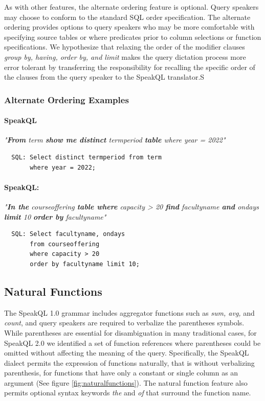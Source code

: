 As with other features, the alternate ordering feature is optional. Query speakers may choose to conform to the standard SQL order specification. The alternate ordering provides options to query speakers who may be more comfortable with specifying source tables or where predicates prior to column selections or function specifications. We hypothesize that relaxing the order of the modifier clauses \emph{group by, having, order by, and limit} makes the query dictation process more error tolerant by transferring the responsibility for recalling the specific order of the clauses from the query speaker to the SpeakQL translator.S

\subsubsection{Alternate Ordering Examples}

\paragraph{SpeakQL} \emph{"\textbf{From} term \textbf{show me distinct} termperiod  \textbf{table} where year = 2022"}
\begin{verbatim}
  SQL: Select distinct termperiod from term 
       where year = 2022;
\end{verbatim}

\paragraph{SpeakQL:} \emph{"\textbf{In the} courseoffering \textbf{table where} capacity > 20 \textbf{find} facultyname \textbf{and} ondays \textbf{limit} 10 \textbf{order by} facultyname"}
\begin{verbatim}
  SQL: Select facultyname, ondays 
       from courseoffering 
       where capacity > 20 
       order by facultyname limit 10;
\end{verbatim}


\subsection{Natural Functions}

The SpeakQL 1.0 grammar includes aggregator functions such as \emph{sum, avg,} and \emph{count}, and query speakers are required to verbalize the parentheses symbols. While parentheses are essential for disambiguation in many traditional cases, for SpeakQL 2.0 we identified a set of function references where parentheses could be omitted without affecting the meaning of the query. Specifically, the SpeakQL dialect permits the expression of functions naturally, that is without verbalizing parenthesis, for functions that have only a constant or single column as an argument (See figure \ref{fig:naturalfunctions}). The natural function feature also permits optional syntax keywords \emph{the} and \emph{of} that surround the function name. 

